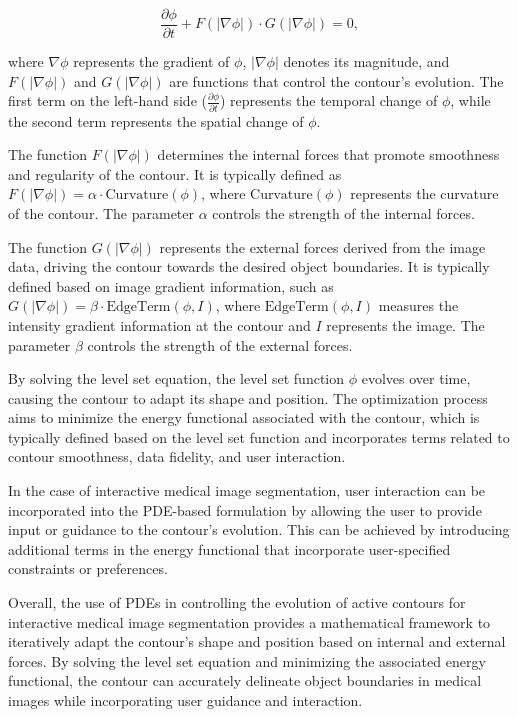 \documentclass[]{report}
\begin{document}
\begin{equation}
    \frac{\partial\phi}{\partial t} + F(\lvert\nabla\phi\rvert) \cdot G(\lvert\nabla\phi\rvert) = 0,
\end{equation}

where $\nabla\phi$ represents the gradient of $\phi$, $\lvert\nabla\phi\rvert$ denotes its magnitude, and $F(\lvert\nabla\phi\rvert)$ and $G(\lvert\nabla\phi\rvert)$ are functions that control the contour's evolution. The first term on the left-hand side ($\frac{\partial\phi}{\partial t}$) represents the temporal change of $\phi$, while the second term represents the spatial change of $\phi$.

The function $F(\lvert\nabla\phi\rvert)$ determines the internal forces that promote smoothness and regularity of the contour. It is typically defined as $F(\lvert\nabla\phi\rvert) = \alpha \cdot \text{Curvature}(\phi)$, where $\text{Curvature}(\phi)$ represents the curvature of the contour. The parameter $\alpha$ controls the strength of the internal forces.

The function $G(\lvert\nabla\phi\rvert)$ represents the external forces derived from the image data, driving the contour towards the desired object boundaries. It is typically defined based on image gradient information, such as $G(\lvert\nabla\phi\rvert) = \beta \cdot \text{EdgeTerm}(\phi, I)$, where $\text{EdgeTerm}(\phi, I)$ measures the intensity gradient information at the contour and $I$ represents the image. The parameter $\beta$ controls the strength of the external forces.

By solving the level set equation, the level set function $\phi$ evolves over time, causing the contour to adapt its shape and position. The optimization process aims to minimize the energy functional associated with the contour, which is typically defined based on the level set function and incorporates terms related to contour smoothness, data fidelity, and user interaction.

In the case of interactive medical image segmentation, user interaction can be incorporated into the PDE-based formulation by allowing the user to provide input or guidance to the contour's evolution. This can be achieved by introducing additional terms in the energy functional that incorporate user-specified constraints or preferences.

Overall, the use of PDEs in controlling the evolution of active contours for interactive medical image segmentation provides a mathematical framework to iteratively adapt the contour's shape and position based on internal and external forces. By solving the level set equation and minimizing the associated energy functional, the contour can accurately delineate object boundaries in medical images while incorporating user guidance and interaction.
\end{document}

